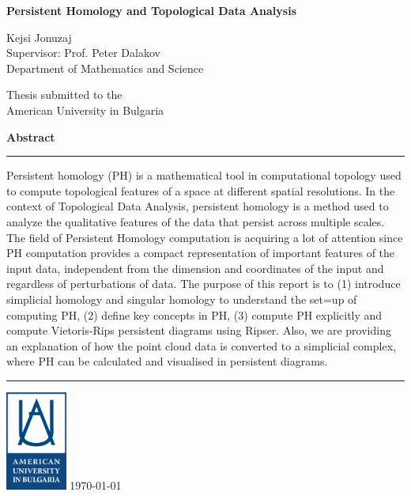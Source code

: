 \documentclass[11pt,a4paper]{report}
\begin{document}
\begin{titlepage}
    \centering
    \vspace*{0.6in}
    \bgroup
    \Huge\bfseries Persistent Homology and Topological Data Analysis \par
    \egroup
    \vspace{0.5in}
    \bgroup
    \Large Kejsi Jonuzaj\\ Supervisor: Prof. Peter Dalakov\\[0.1in]
    \egroup
    Department of Mathematics and Science \par
    \vspace{0.5in}
    \bgroup
    Thesis submitted to the\\[0.2in]
    \Large American University in Bulgaria
    \egroup
    \par
    \vspace{0.5in}
    {\LARGE\bfseries Abstract}
    \par
    \vspace{0.1in}
    \hrule
    \vspace{0.1in}
    \begin{minipage}{0.9\textwidth}
    Persistent homology (PH) is a mathematical tool in computational topology used to compute topological features of a space at different spatial resolutions. In the context of Topological Data 
     Analysis, persistent homology is a method used to analyze the qualitative features of the data that persist across multiple scales. The field of Persistent Homology computation is acquiring a lot of attention since PH computation provides a compact representation of important features of the input data, independent from the dimension and coordinates of the input and regardless of perturbations of data. The purpose of this report is to 
     (1) introduce simplicial homology and singular homology to understand the set=up of computing PH, (2) define key concepts in PH, (3) compute PH explicitly and compute Vietoris-Rips persistent diagrams using Ripser. Also, we are providing an explanation of how the point cloud data is converted to a simplicial complex, where PH can be calculated and visualised in persistent diagrams. 
    \end{minipage}
    \vspace{0.1in}
    \hrule
    \vspace{0.2in}
    \includegraphics[width=2cm]{aubg.png}
    \vfill
    \today
  \end{titlepage}
\end{document}
